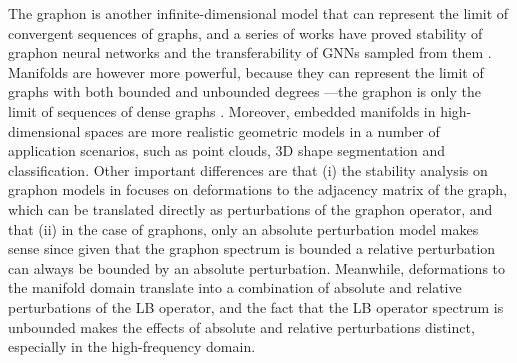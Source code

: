  The graphon is another infinite-dimensional model that can represent the limit of convergent sequences of graphs, and a series of works have proved stability of graphon neural networks and the transferability of GNNs sampled from them \cite{ruiz2020graphon, ruiz2021transferability, ruiz2021graph, maskey2021transferability, keriven2020convergence}. Manifolds are however more powerful, because they can represent the limit of graphs with both bounded and unbounded degrees \cite{belkin2008towards}---the graphon is only the limit of sequences of dense graphs \cite{lovasz2012large}. Moreover, embedded manifolds in high-dimensional spaces are more realistic geometric models in a number of application scenarios, such as point clouds, 3D shape segmentation and classification. Other important differences are that (i) the stability analysis on graphon models in \cite{ruiz2021graphon,ruiz2020graphon} focuses on deformations to the adjacency matrix of the graph, which can be translated directly as perturbations of the graphon operator, and that (ii) in the case of graphons, only an absolute perturbation model makes sense since given that the graphon spectrum is bounded a relative perturbation can always be bounded by an absolute perturbation. Meanwhile, deformations to the manifold domain translate into a combination of absolute and relative perturbations of the LB operator, and the fact that the LB operator spectrum is unbounded makes the effects of absolute and relative perturbations distinct, especially in the high-frequency domain.




